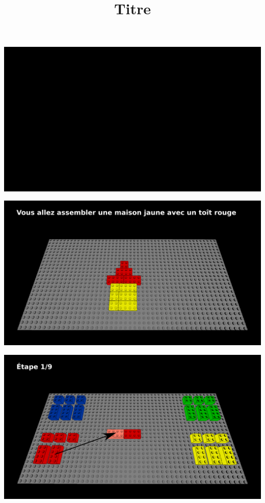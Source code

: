 \documentclass[aspectratio=169]{beamer}
\title{Titre}
\begin{document}
\begin{frame}
    \begin{center}
        \includegraphics[width=\linewidth]{void.png}
    \end{center}
\end{frame}

\begin{frame}
  \begin{center}
      \includegraphics[width=\linewidth]{figure.png}
  \end{center}
\end{frame}

\begin{frame}
  \includegraphics[width=\linewidth]{step1.png}
\end{frame}
\end{document}
